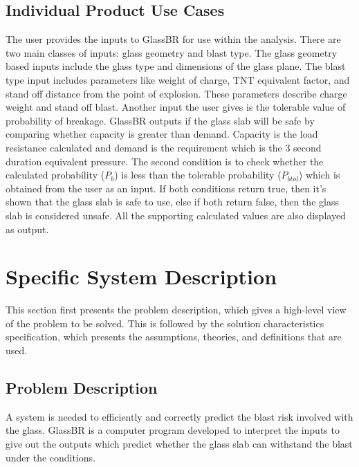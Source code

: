 \documentclass[12pt]{article}
\begin{document}
\subsection{Individual Product Use Cases}
\label{Sec:IndividualProdUC}
The user provides the inputs to GlassBR for use within the analysis. There are two main classes of inputs: glass geometry and blast type. The glass geometry based inputs include the glass type and dimensions of the glass plane. The blast type input includes parameters like weight of charge, TNT equivalent factor, and stand off distance from the point of explosion. These parameters describe charge weight and stand off blast. Another input the user gives is the tolerable value of probability of breakage. GlassBR outputs if the glass slab will be safe by comparing whether capacity is greater than demand. Capacity is the load resistance calculated and demand is the requirement which is the 3 second duration equivalent pressure. The second condition is to check whether the calculated probability (${P_{b}}$) is less than the tolerable probability (${P_{btol}}$) which is obtained from the user as an input. If both conditions return true, then it's shown that the glass slab is safe to use, else if both return false, then the glass slab is considered unsafe. All the supporting calculated values are also displayed as output.
\section{Specific System Description}
\label{Sec:SpecSystDesc}
This section first presents the problem description, which gives a high-level view of the problem to be solved. This is followed by the solution characteristics specification, which presents the assumptions, theories, and definitions that are used.
\subsection{Problem Description}
\label{Sec:ProbDesc}
A system is needed to efficiently and correctly predict the blast risk involved with the glass. GlassBR is a computer program developed to interpret the inputs to give out the outputs which predict whether the glass slab can withstand the blast under the conditions.
\end{document}
